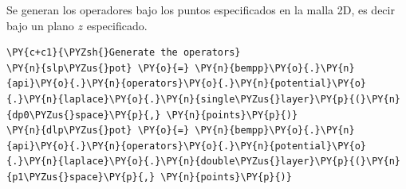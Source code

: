 Se generan los operadores bajo los puntos especificados en la malla 2D, es decir bajo un plano $z$ especificado.
\begin{tcolorbox}
\begin{Verbatim}[commandchars=\\\{\}]
\PY{c+c1}{\PYZsh{}Generate the operators} 
\PY{n}{slp\PYZus{}pot} \PY{o}{=} \PY{n}{bempp}\PY{o}{.}\PY{n}{api}\PY{o}{.}\PY{n}{operators}\PY{o}{.}\PY{n}{potential}\PY{o}{.}\PY{n}{laplace}\PY{o}{.}\PY{n}{single\PYZus{}layer}\PY{p}{(}\PY{n}{dp0\PYZus{}space}\PY{p}{,} \PY{n}{points}\PY{p}{)}
\PY{n}{dlp\PYZus{}pot} \PY{o}{=} \PY{n}{bempp}\PY{o}{.}\PY{n}{api}\PY{o}{.}\PY{n}{operators}\PY{o}{.}\PY{n}{potential}\PY{o}{.}\PY{n}{laplace}\PY{o}{.}\PY{n}{double\PYZus{}layer}\PY{p}{(}\PY{n}{p1\PYZus{}space}\PY{p}{,} \PY{n}{points}\PY{p}{)}
\end{Verbatim}
\end{tcolorbox}


